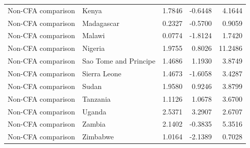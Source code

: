 \begin{table}
\begin{tabular}[t]{llrrr}
Non-CFA comparison & Kenya & 1.7846 & -0.6448 & 4.1644\\
\addlinespace
Non-CFA comparison & Madagascar & 0.2327 & -0.5700 & 0.9059\\
Non-CFA comparison & Malawi & 0.0774 & -1.8124 & 1.7420\\
Non-CFA comparison & Nigeria & 1.9755 & 0.8026 & 11.2486\\
Non-CFA comparison & Sao Tome and Principe & 1.4686 & 1.1930 & 3.8749\\
Non-CFA comparison & Sierra Leone & 1.4673 & -1.6058 & 3.4287\\
\addlinespace
Non-CFA comparison & Sudan & 1.9580 & 0.9246 & 3.8799\\
Non-CFA comparison & Tanzania & 1.1126 & 1.0678 & 3.6700\\
Non-CFA comparison & Uganda & 2.5371 & 3.2907 & 2.6707\\
Non-CFA comparison & Zambia & 2.1402 & -0.3835 & 5.3516\\
Non-CFA comparison & Zimbabwe & 1.0164 & -2.1389 & 0.7028\\
\bottomrule
\end{tabular}
\end{table}